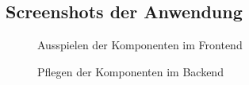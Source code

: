 \subsection{Screenshots der Anwendung}
\label{Screenshots}
\begin{figure}[htb]
\centering
{}
\caption{Ausspielen der Komponenten im Frontend}
\end{figure}
\begin{figure}[htb]
\centering
{}
\caption{Pflegen der Komponenten im Backend}
\end{figure}
\clearpage
